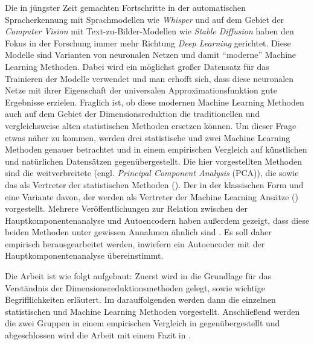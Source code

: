 Die in jüngster Zeit gemachten Fortschritte in der automatischen Spracherkennung mit Sprachmodellen
wie \textit{Whisper} \parencite{Radford.2022} und auf dem Gebiet der \textit{Computer Vision} mit Text-zu-Bilder-Modellen
wie \textit{Stable Diffusion} \parencite{Rombach.2021} haben den Fokus in der Forschung immer mehr Richtung \textit{Deep Learning}
gerichtet. Diese Modelle sind Varianten von neuronalen Netzen und damit \enquote{moderne} Machine
Learning Methoden. Dabei wird ein möglichst großer Datensatz für das Trainieren der Modelle
verwendet und man erhofft sich, dass diese neuronalen Netze mit ihrer Eigenschaft der universalen
Approximationsfunktion \parencites[194 -- 197]{Goodfellow.2016}{Hornik.1989} gute Ergebnisse erzielen. Fraglich ist, ob diese
modernen Machine Learning Methoden auch auf dem Gebiet der Dimensionsreduktion die traditionellen
und vergleichsweise alten statistischen Methoden ersetzen können. Um dieser Frage etwas näher zu
kommen, werden drei statistische und zwei Machine Learning Methoden genauer betrachtet und in einem
empirischen Vergleich auf künstlichen und natürlichen Datensätzen gegenübergestellt. Die hier
vorgestellten Methoden sind die weitverbreitete  (engl.
\textit{Principal Component Analysis} (PCA)), die  sowie das  als Vertreter der statistischen Methoden
(). Der  in der klassischen Form und
eine Variante davon, der  werden als Vertreter der Machine
Learning Ansätze () vorgestellt. Mehrere Veröffentlichungen zur
Relation zwischen der Hauptkomponentenanalyse und Autoencodern haben außerdem gezeigt, dass diese
beiden Methoden unter gewissen Annahmen ähnlich sind \parencites{Baldi.1989}{Bourlard.1988}{Plaut.2018}. Es soll daher empirisch herausgearbeitet werden,
inwiefern ein Autoencoder mit der Hauptkomponentenanalyse übereinstimmt.

Die Arbeit ist wie folgt aufgebaut: Zuerst wird in  die Grundlage
für das Verständnis der Dimensionsreduktionsmethoden gelegt, sowie wichtige Begrifflichkeiten
erläutert. Im darauffolgenden  werden dann die einzelnen
statistischen und Machine Learning Methoden vorgestellt. Anschließend werden die zwei Gruppen in
einem empirischen Vergleich in  gegenübergestellt und abgeschlossen wird die
Arbeit mit einem Fazit in .